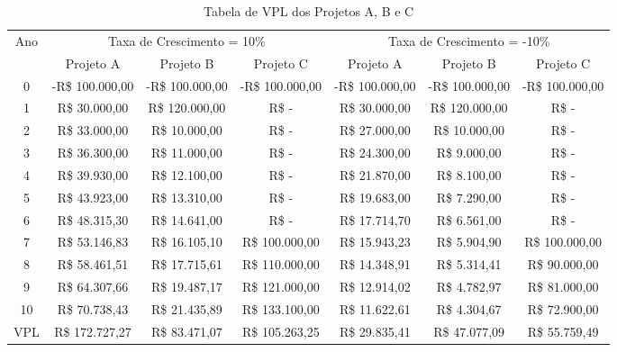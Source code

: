 \documentclass[12pt,letterpaper]{article}
\newcommand{\1}{\mathbbm{1}}
\numberwithin{equation}{section}
\begin{document}
\begin{table}[H]
    \centering
    \begin{adjustbox}{max width=0.95\textwidth,max totalheight=0.95\textheight,keepaspectratio,center}
    \begin{tabular}{|c|c|c|c|c|c|c|}
        \hline
        Ano & \multicolumn{3}{c|}{Taxa de Crescimento = 10\%} & \multicolumn{3}{c|}{Taxa de Crescimento = -10\%} \\
        \cline{2-7}
        & Projeto A & Projeto B & Projeto C & Projeto A & Projeto B & Projeto C \\
        \hline
        0 & -R\$ 100.000,00 & -R\$ 100.000,00 & -R\$ 100.000,00 & -R\$ 100.000,00 & -R\$ 100.000,00 & -R\$ 100.000,00 \\
        1 & R\$ 30.000,00 & R\$ 120.000,00 & R\$ - & R\$ 30.000,00 & R\$ 120.000,00 & R\$ - \\
        2 & R\$ 33.000,00 & R\$ 10.000,00 & R\$ - & R\$ 27.000,00 & R\$ 10.000,00 & R\$ - \\
        3 & R\$ 36.300,00 & R\$ 11.000,00 & R\$ - & R\$ 24.300,00 & R\$ 9.000,00 & R\$ - \\
        4 & R\$ 39.930,00 & R\$ 12.100,00 & R\$ - & R\$ 21.870,00 & R\$ 8.100,00 & R\$ - \\
        5 & R\$ 43.923,00 & R\$ 13.310,00 & R\$ - & R\$ 19.683,00 & R\$ 7.290,00 & R\$ - \\
        6 & R\$ 48.315,30 & R\$ 14.641,00 & R\$ - & R\$ 17.714,70 & R\$ 6.561,00 & R\$ - \\
        7 & R\$ 53.146,83 & R\$ 16.105,10 & R\$ 100.000,00 & R\$ 15.943,23 & R\$ 5.904,90 & R\$ 100.000,00 \\
        8 & R\$ 58.461,51 & R\$ 17.715,61 & R\$ 110.000,00 & R\$ 14.348,91 & R\$ 5.314,41 & R\$ 90.000,00 \\
        9 & R\$ 64.307,66 & R\$ 19.487,17 & R\$ 121.000,00 & R\$ 12.914,02 & R\$ 4.782,97 & R\$ 81.000,00 \\
        10 & R\$ 70.738,43 & R\$ 21.435,89 & R\$ 133.100,00 & R\$ 11.622,61 & R\$ 4.304,67 & R\$ 72.900,00 \\
        \hline
        \multicolumn{1}{|c|}{VPL} & R\$ 172.727,27 & R\$ 83.471,07 & R\$ 105.263,25 & R\$ 29.835,41 & R\$ 47.077,09 & R\$ 55.759,49 \\
        \hline
    \end{tabular}
    \end{adjustbox}
    \caption{Tabela de VPL dos Projetos A, B e C}
    \label{tab:crescimentoefeitos}
\end{table}
\end{document}
